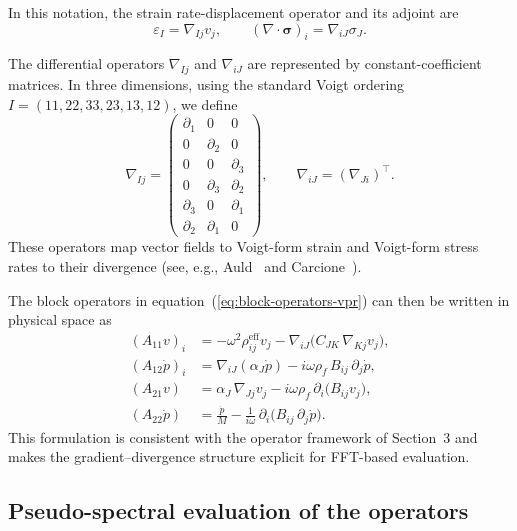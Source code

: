 \documentclass[pdflatex,sn-mathphys-num]{sn-jnl}
\theoremstyle{thmstyleone}%
\theoremstyle{thmstyletwo}%
\theoremstyle{thmstylethree}%
\theoremstyle{definition}
\begin{document}
	In this notation, the strain rate-displacement operator and its adjoint are
	\[
	\varepsilon_I = \nabla_{I j} v_j,
	\qquad
	(\nabla \cdot \boldsymbol{\sigma})_i = \nabla_{iJ} \sigma_J.
	\]
	
	The differential operators $\nabla_{Ij}$ and $\nabla_{iJ}$ are represented by constant-coefficient matrices. In three dimensions, using the standard Voigt ordering $I = (11,22,33,23,13,12)$, we define
	\[
	\nabla_{Ij} =
	\begin{pmatrix}
		\partial_1 & 0 & 0 \\
		0 & \partial_2 & 0 \\
		0 & 0 & \partial_3 \\
		0 & \partial_3 & \partial_2 \\
		\partial_3 & 0 & \partial_1 \\
		\partial_2 & \partial_1 & 0
	\end{pmatrix},
	\qquad
	\nabla_{iJ} = (\nabla_{J i})^{\top}.
	\]
	These operators map vector fields to Voigt-form strain and Voigt-form stress rates to their divergence (see, e.g., Auld~\cite{Auld1973} and Carcione~\cite{Carcione2022}).
	
	The block operators in equation~(\ref{eq:block-operators-vpr}) can then be written in physical space as
	\[
	\begin{aligned}
		(A_{11} v)_i 
		&= -\omega^2 \rho^{\mathrm{eff}}_{ij} v_j
		- \nabla_{iJ} \big( C_{JK} \, \nabla_{Kj} v_j \big), \\
		(A_{12} \dot p)_i 
		&= \nabla_{iJ}(\alpha_J \dot p)
		- i\omega \rho_f \, B_{ij} \, \partial_j \dot p, \\
		(A_{21} v) 
		&= \alpha_J \, \nabla_{Jj} v_j
		- i\omega \rho_f \, \partial_i \big(B_{ij} v_j\big), \\
		(A_{22} \dot p) 
		&= \frac{\dot p}{M}
		- \frac{1}{i\omega} \, \partial_i \big( B_{ij} \, \partial_j \dot p \big).
	\end{aligned}
	\]
	This formulation is consistent with the operator framework of Section~3 and makes the gradient–divergence structure explicit for FFT-based evaluation.
	
	
	\subsection{Pseudo-spectral evaluation of the operators}
	
\end{document}

